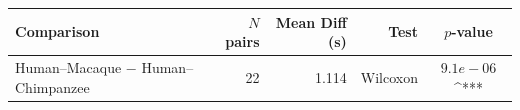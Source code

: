 \begin{tabular}{lrrrc}
    \toprule
    \textbf{Comparison} & \textbf{$N$ pairs} & \textbf{Mean Diff (s)} & \textbf{Test} & \textbf{$p$-value} \\
    \midrule
    Human–Macaque $-$ Human–Chimpanzee & 22 & 1.114 & Wilcoxon & $9.1e-06$^{***}$$ \\
    \bottomrule
    \end{tabular}